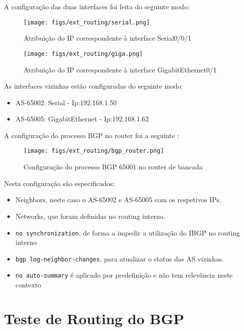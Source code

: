 A configuração das duas interfaces foi feita do seguinte modo:

\begin{figure}[H]
    \centering
    \texttt{[image: figs/ext\_routing/serial.png]}
    \caption{Atribuição do IP correspondente à interface Serial0/0/1}
    \label{fig:serial}
\end{figure}

\begin{figure}[H]
    \centering
    \texttt{[image: figs/ext\_routing/giga.png]}
    \caption{Atribuição do IP correspondente à interface GigabitEthernet0/1}
    \label{fig:giga}
\end{figure}


As interfaces vizinhas estão configuradas do seguinte modo:
\begin{itemize}
    \item AS-65002: Serial - Ip:192.168.1.50
    \item AS-65005: GigabitEthernet - Ip:192.168.1.62
\end{itemize}

A configuração do processo BGP no router foi a seguinte \cite{cisco_bgp}:

\begin{figure}[H]
    \centering
    \texttt{[image: figs/ext\_routing/bgp\_router.png]}
    \caption{Configuração do processo BGP 65001 no router de bancada}
    \label{fig:bgp_router}
\end{figure}

Nesta configuração são especificados:
\begin{itemize}
    \item Neighbors, neste caso o AS-65002 e AS-65005 com os respetivos IPs.
    \item Networks, que foram definidas no routing interno.
    \item \verb|no synchronization|, de forma a impedir a utilização do IBGP no routing interno
    \item \verb|bgp log-neighbor-changes|, para atualizar o status das AS vizinhas.
    \item \verb|no auto-summary| é aplicado por predefinição e não tem relevância neste contexto
\end{itemize}

\section{Teste de Routing do BGP}

